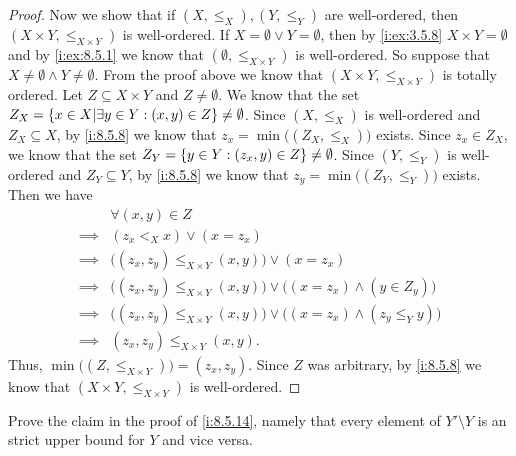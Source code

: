 \begin{proof}
  Now we show that if \((X, \leq_X), (Y, \leq_Y)\) are well-ordered, then \((X \times Y, \leq_{X \times Y})\) is well-ordered.
  If \(X = \emptyset \lor Y = \emptyset\), then by \cref{i:ex:3.5.8} \(X \times Y = \emptyset\) and by \cref{i:ex:8.5.1} we know that \((\emptyset, \leq_{X \times Y})\) is well-ordered.
  So suppose that \(X \neq \emptyset \land Y \neq \emptyset\).
  From the proof above we know that \((X \times Y, \leq_{X \times Y})\) is totally ordered.
  Let \(Z \subseteq X \times Y\) and \(Z \neq \emptyset\).
  We know that the set \(Z_X = \left\lbrace x \in X | \exists y \in Y : (x, y) \in Z\right\rbrace \neq \emptyset\).
  Since \((X, \leq_X)\) is well-ordered and \(Z_X \subseteq X\), by \cref{i:8.5.8} we know that \(z_x = \min\big((Z_X, \leq_X)\big)\) exists.
  Since \(z_x \in Z_X\), we know that the set \(Z_Y = \left\lbrace y \in Y : (z_x, y) \in Z\right\rbrace \neq \emptyset\).
  Since \((Y, \leq_Y)\) is well-ordered and \(Z_Y \subseteq Y\), by \cref{i:8.5.8} we know that \(z_y = \min\big((Z_Y, \leq_Y)\big)\) exists.
  Then we have
  \begin{align*}
             & \forall (x, y) \in Z                                                                        \\
    \implies & (z_x <_X x) \lor (x = z_x)                                                                  \\
    \implies & \big((z_x, z_y) \leq_{X \times Y} (x, y)\big) \lor (x = z_x)                                \\
    \implies & \big((z_x, z_y) \leq_{X \times Y} (x, y)\big) \lor \big((x = z_x) \land (y \in Z_y)\big)    \\
    \implies & \big((z_x, z_y) \leq_{X \times Y} (x, y)\big) \lor \big((x = z_x) \land (z_y \leq_Y y)\big) \\
    \implies & (z_x, z_y) \leq_{X \times Y} (x, y).
  \end{align*}
  Thus, \(\min\big((Z, \leq_{X \times Y})\big) = (z_x, z_y)\).
  Since \(Z\) was arbitrary, by \cref{i:8.5.8} we know that \((X \times Y, \leq_{X \times Y})\) is well-ordered.
\end{proof}

\begin{ex}\label{i:ex:8.5.13}
  Prove the claim in the proof of \cref{i:8.5.14}, namely that every element of \(Y' \setminus Y\) is an strict upper bound for \(Y\) and vice versa.
\end{ex}

